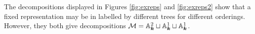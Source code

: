 \documentclass{amsart}
\theoremstyle{definition}
\begin{document}
The decompositions displayed in Figures \ref{fig:exreps} and \ref{fig:exreps2} show that a fixed representation may be in labelled by different trees for different orderings.
However, they both give decompositions $\mathcal{M} = \mathbb{A}_{\boldsymbol{k}}^2 \sqcup \mathbb{A}_{\boldsymbol{k}}^1 \sqcup \mathbb{A}_{\boldsymbol{k}}^1$.


\end{document}
